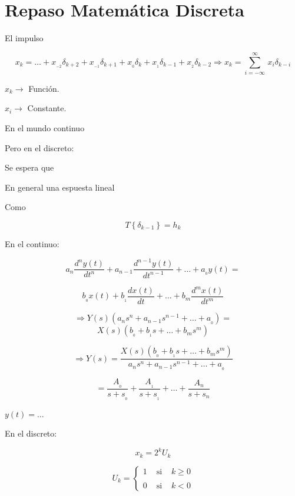 \section{Repaso Matemática Discreta}


El impulso



$$x_{k} = \ldots + x_{_{-2}}\delta_{k + 2} + x_{_{-1}}\delta_{k + 1} + x_{_0} \delta_{k} + x_{_1}\delta_{k - 1} + x_{_2}\delta_{k - 2} \Rightarrow x_{k} = \sum_{i = -\infty}^{\infty}\, x_{i}\delta_{k - i}$$

$x_{k} \rightarrow $ Función.

$x_{i} \rightarrow $ Constante.

En el mundo continuo


Pero en el discreto:


Se espera que 


En general una espuesta lineal


Como 

$$T\left\lbrace \delta_{k - 1} \right\rbrace = h_{k}$$


En el continuo:

$$a_{n}\dfrac{d^{n}y(t)}{dt^{n}} + a_{n - 1}\dfrac{d^{n - 1}y(t)}{dt^{n - 1}} + \ldots + a_{_0}y(t) = $$

$$b_{_0}x(t) + b_{_1}\dfrac{dx(t)}{dt} + \ldots + b_{m} \dfrac{d^{m}x(t)}{dt^{m}}$$

$$\Rightarrow Y(s)(a_{n}s^{n} + a_{n - 1}s^{n - 1} + \ldots + a_{_0}) = $$
$$X(s)(b_{_0} + b_{_1}s + \ldots + b_{m}s^{m})$$

$$\Rightarrow Y(s) = \dfrac{X(s)(b_{_0} + b_{_1}s + \ldots + b_{m}s^{m})}{a_{n}s^{n} + a_{n - 1}s^{n - 1} + \ldots + a_{_0}}$$

$$= \dfrac{A_{_0}}{s + s_{_0}} + \dfrac{A_{_1}}{s + s_{_1}} + \ldots + \dfrac{A_{n}}{s + s_{n}}$$

$y(t) = \ldots$

En el discreto:

$$x_{k} = 2^k U_{k}$$

\[
U_{k} = \left\{
\begin{array}{lcl}
1 & \mbox{	si } & k\geq 0 \\
  &              &         \\    
0 & \mbox{ si }  & k < 0
\end{array}
\right.
\]

